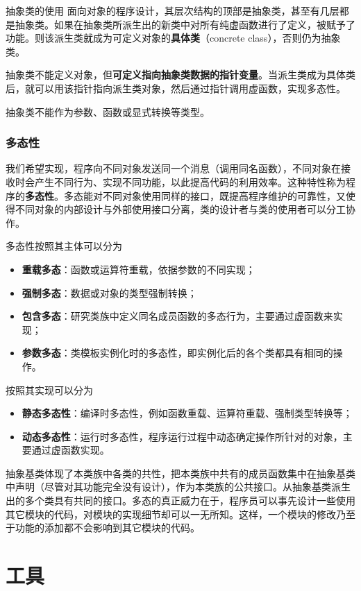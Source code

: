 \documentclass[10pt, a4paper, oneside, fontset=none]{ctexart}
\theoremstyle{plain}
\theoremstyle{definition}
\newcommand{\zhu}[2][]{\begin{note}{#1}\xiu #2\end{note}}
\newcommand{\tboba}[1]{\textbf{\kai\color{bali!75!black}#1}}
\newcommand{\tboqi}[1]{\textbf{\xiu\color{qinglv!75!black}#1}}
\begin{document}
\zhu[抽象类的使用]{
	面向对象的程序设计，其层次结构的顶部是抽象类，甚至有几层都是抽象类。如果在抽象类所派生出的新类中对所有纯虚函数进行了定义，被赋予了功能。则该派生类就成为可定义对象的\tboqi{具体类}（concrete class），否则仍为抽象类。
	
	抽象类不能定义对象，但\tboqi{可定义指向抽象类数据的指针变量}。当派生类成为具体类后，就可以用该指针指向派生类对象，然后通过指针调用虚函数，实现多态性。
	
	抽象类不能作为参数、函数或显式转换等类型。
}

\subsubsection{多态性}

我们希望实现，程序向不同对象发送同一个消息（调用同名函数），不同对象在接收时会产生不同行为、实现不同功能，以此提高代码的利用效率。这种特性称为程序的\tboba{多态性}。多态能对不同对象使用同样的接口，既提高程序维护的可靠性，又使得不同对象的内部设计与外部使用接口分离，类的设计者与类的使用者可以分工协作。

多态性按照其主体可以分为
\begin{itemize}
	\item \textbf{重载多态}：函数或运算符重载，依据参数的不同实现；
	\item \textbf{强制多态}：数据或对象的类型强制转换；
	\item \textbf{包含多态}：研究类族中定义同名成员函数的多态行为，主要通过虚函数来实现；
	\item \textbf{参数多态}：类模板实例化时的多态性，即实例化后的各个类都具有相同的操作。
\end{itemize}
按照其实现可以分为
\begin{itemize}
	\item \textbf{静态多态性}：编译时多态性，例如函数重载、运算符重载、强制类型转换等；
	\item \textbf{动态多态性}：运行时多态性，程序运行过程中动态确定操作所针对的对象，主要通过虚函数实现。
\end{itemize}

抽象基类体现了本类族中各类的共性，把本类族中共有的成员函数集中在抽象基类中声明（尽管对其功能完全没有设计），作为本类族的公共接口。从抽象基类派生出的多个类具有共同的接口。多态的真正威力在于，程序员可以事先设计一些使用其它模块的代码，对模块的实现细节却可以一无所知。这样，一个模块的修改乃至于功能的添加都不会影响到其它模块的代码。

\newpage
\section{工具}
\end{document}
